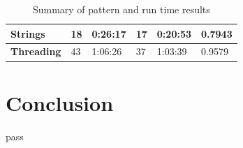\documentclass[12pt]{article}
\begin{document}
\begin{table}[ht]
{\begin{tabular}{|l|l|l|l|l|l|}
\textbf{Strings}         & 18                                                                       & 0:26:17                                                                        & 17                                                                                        & 0:20:53                                                                         & 0.7943                                                                           \\ \hline
\textbf{Threading}       & 43                                                                       & 1:06:26                                                                        & 37                                                                                        & 1:03:39                                                                         & 0.9579                                                                           \\ \hline
\end{tabular}
}
\caption{\label{result_table}
    Summary of pattern and run time results
}
\end{table}

\section{Conclusion}
pass

\pagebreak


\end{document}
